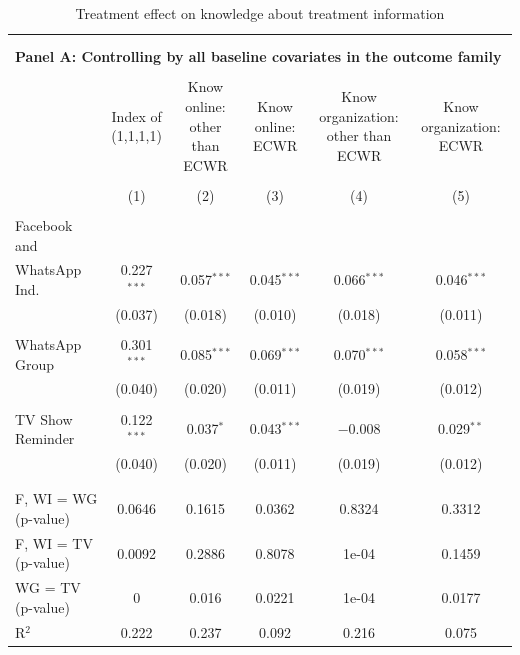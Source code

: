 \documentclass[12pt]{article}
\begin{document}
\begin{table}[H] \centering 
  \caption{Treatment effect on knowledge about treatment information} 
  \label{} 
\footnotesize 
\begin{tabular}{@{\extracolsep{0pt}}lccccc} 
\\[-1.8ex]\hline 
\hline \\[-1.8ex] 
\\[-0.5ex] 
\multicolumn{6}{l}{\textbf{Panel A: Controlling by all baseline covariates in the outcome family}} \\
\hline \\[-1ex] 
 & \shortstack{Index of \\ (1,1,1,1)} & \shortstack{Know online:\\ other than ECWR } & \shortstack{Know online:\\ ECWR} & \shortstack{Know organization:\\ other than ECWR} & \shortstack{Know organization:\\ ECWR} \\ 
\\[-1.8ex] & (1) & (2) & (3) & (4) & (5)\\ 
\hline \\[-1.8ex] 
 Facebook and \\ WhatsApp Ind. & 0.227$^{***}$ & 0.057$^{***}$ & 0.045$^{***}$ & 0.066$^{***}$ & 0.046$^{***}$ \\ 
  & (0.037) & (0.018) & (0.010) & (0.018) & (0.011) \\ 
  & & & & & \\ 
 WhatsApp Group & 0.301$^{***}$ & 0.085$^{***}$ & 0.069$^{***}$ & 0.070$^{***}$ & 0.058$^{***}$ \\ 
  & (0.040) & (0.020) & (0.011) & (0.019) & (0.012) \\ 
  & & & & & \\ 
 TV Show Reminder & 0.122$^{***}$ & 0.037$^{*}$ & 0.043$^{***}$ & $-$0.008 & 0.029$^{**}$ \\ 
  & (0.040) & (0.020) & (0.011) & (0.019) & (0.012) \\ 
  & & & & & \\ 
\hline \\[-1.8ex] 
F, WI = WG (p-value) & 0.0646 & 0.1615 & 0.0362 & 0.8324 & 0.3312 \\ 
F, WI = TV (p-value) & 0.0092 & 0.2886 & 0.8078 & 1e-04 & 0.1459 \\ 
WG = TV (p-value) & 0 & 0.016 & 0.0221 & 1e-04 & 0.0177 \\ 
R$^{2}$ & 0.222 & 0.237 & 0.092 & 0.216 & 0.075 \\ 

\end{tabular}
\end{table}
\end{document}
